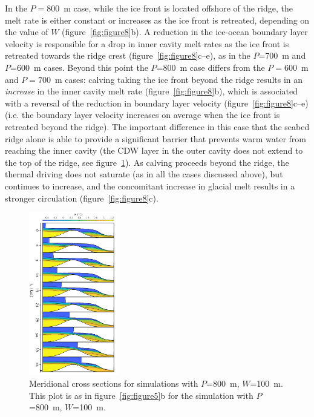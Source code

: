 \documentclass[draft]{agujournal2019}
\begin{document}
In the $P=800$~m case, while the ice front is located offshore of the ridge, the melt rate is either constant or increases as the ice front is retreated, depending on the value of $W$ (figure~\ref{fig:figure8}b). A reduction in the ice-ocean boundary layer velocity is responsible for a drop in inner cavity melt rates as the ice front is retreated towards the ridge crest (figure~\ref{fig:figure8}c--e), as in the $P$=700~m and $P$=600~m cases. Beyond this point the $P$=800~m case differs from the $P = 600$~m and $P = 700$~m cases: calving taking the ice front beyond the ridge results in an \emph{increase} in the inner cavity melt rate (figure~\ref{fig:figure8}b), which is associated with a reversal of the reduction in boundary layer velocity (figure~\ref{fig:figure8}c--e) (i.e. the boundary layer velocity increases on average when the ice front is retreated beyond the ridge). The important difference in this case that the seabed ridge alone is able to provide a significant barrier that prevents warm water from reaching the inner cavity (the CDW layer in the outer cavity does not extend to the top of the ridge, see figure~\ref{fig:figure9}). As calving proceeds beyond the ridge, the thermal driving does not saturate (as in all the cases discussed above), but continues to increase, and the concomitant increase in glacial melt results in a stronger circulation (figure~\ref{fig:figure8}c).

\begin{figure}
    \centering
    \includegraphics[width = 0.35\textwidth]{../make_figures/plots/figure9.pdf}
    \caption{Meridional cross sections for simulations with $P$=800~m, $W$=100~m. This plot is as in figure~\ref{fig:figure5}b for the simulation with $P$=800~m, $W$=100~m. }
    \label{fig:figure9}
\end{figure}
\end{document}

